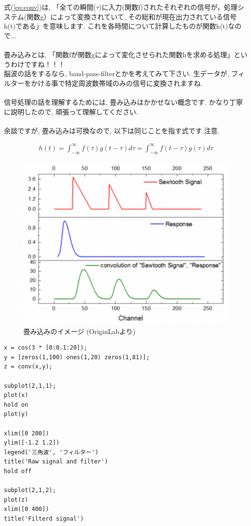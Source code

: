 \documentclass[11pt,a4paper,uplatex]{ujreport}
\begin{document}
式(\ref{eq:conv})は, 「全ての瞬間($\tau$)に入力(関数f)されたそれぞれの信号が，処理システム(関数g）によって変換されていて, その総和が現在出力されている信号h(t)である」を意味します. これを各時間について計算したものが関数h(t)なので...\\
\\
畳み込みとは, 「関数fが関数gによって変化させられた関数hを求める処理」というわけですね！！！\\
脳波の話をするなら, band-pass-filterとかを考えてみて下さい. 生データが, フィルターをかける事で特定周波数帯域のみの信号に変換されますね. \\
\\
信号処理の話を理解するためには, 畳み込みはかかせない概念です. かなり丁寧に説明したので, 頑張って理解してください.\\
\\
余談ですが, 畳み込みは可換なので, 以下は同じことを指す式です.注意.

\begin{eqnarray}
h(t) = \int^{\infty}_{-\infty} f(\tau) g(t - \tau) d\tau=
 \int^{\infty}_{-\infty} f(t-\tau) g(\tau) d\tau
\end{eqnarray}

\begin{figure}[H]
\label{im:convolution}
  \centering
  \includegraphics[width=120mm,bb=0 0 350 276]{../figures/Convolution.png}
  \caption{畳み込みのイメージ (OriginLabより)}
\end{figure}

\begin{lstlisting}[caption=畳み込みのコード,label=sc:conv]
x = cos(3 * [0:0.1:20]);
y = [zeros(1,100) ones(1,20) zeros(1,81)];
z = conv(x,y);

subplot(2,1,1);
plot(x)
hold on
plot(y)

xlim([0 200])
ylim([-1.2 1.2])
legend('三角波', 'フィルター')
title('Raw signal and filter')
hold off

subplot(2,1,2); 
plot(z)
xlim([0 400])
title('Filterd signal')
\end{lstlisting}
\end{document}
